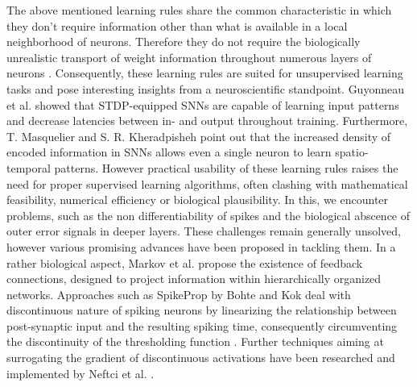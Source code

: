 \documentclass[letterpaper, 10 pt, conference]{ieeeconf}  %
\begin{document}
The above mentioned learning rules share the common characteristic in which they don't require information other than what is available 
in a local neighborhood of neurons. Therefore they do not require the biologically unrealistic 
transport of weight information throughout numerous layers of neurons \cite{samadiDeepLearningDynamic2017} \cite{chintaAdaptiveOptimalControl2012}
\cite{crickRecentExcitementNeural1989}\cite{decoNeurodynamicalCorticalModel2004}. Consequently, these learning rules 
are suited for unsupervised learning tasks and pose interesting 
insights from a neuroscientific standpoint. Guyonneau et al. \cite{masquelierSpikeTimingDependent2008} \cite{tavanaeiDeepLearningSpiking2019}
showed that STDP-equipped SNNs are capable of learning input 
patterns and decrease latencies between in- and output throughout training. Furthermore, T. Masquelier \cite{masquelierSpikeTimingDependent2008}
and S. R. Kheradpisheh \cite{tavanaeiDeepLearningSpiking2019} point out that 
the increased density of encoded information in SNNs allows even a single neuron to learn spatio-temporal patterns. However practical usability
of these learning rules raises the need for proper supervised learning algorithms, often clashing with mathematical feasibility, numerical efficiency 
or biological plausibility. In this, we encounter problems, such as the non differentiability of spikes and the biological abscence of outer error 
signals in deeper layers. These challenges remain generally unsolved, however various promising advances have been proposed in tackling them.
In a rather biological aspect, Markov et al.\cite{markovAnatomyHierarchyFeedforward2014} propose the existence of
feedback connections, designed to project information within
hierarchically organized networks. Approaches such as SpikeProp by Bohte and Kok deal with discontinuous nature of spiking neurons by linearizing 
the relationship between post-synaptic input and the resulting spiking time, consequently circumventing the discontinuity of the 
thresholding function \cite{bohteSpikePropBackpropagationNetworks}. Further techniques aiming at surrogating the gradient of 
discontinuous activations have been researched 
and implemented by Neftci et al. \cite{neftciSurrogateGradientLearning2019}.
\end{document}
